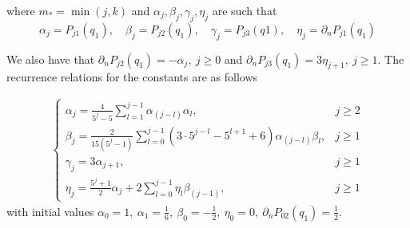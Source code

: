 \documentclass[12pt]{article}
\theoremstyle{plain}
\theoremstyle{definition}
\theoremstyle{remark}
\begin{document}
where $m_* = \min(j,k)$ and $\alpha_j, \beta_j, \gamma_j, \eta_j$ are such that 
$$\alpha_j = P_{j1}(q_1), \quad \beta_j = P_{j2}(q_1), \quad \gamma_j = P_{j3}(q1), \quad \eta_j = \partial_nP_{j1}(q_1)$$

We also have that $\partial_nP_{j2}(q_1) = -\alpha_j,\ j \geq 0$ and $\partial_nP_{j3}(q_1) = 3\eta_{j+1},\ j \geq 1$. The recurrence relations for the constants are as follows \cite{NSTY}

\begin{gather}
    \begin{cases}
    \alpha_j = \frac{4}{5^j - 5}\sum\limits_{l=1}^{j-1}\alpha_{(j-l)}\alpha_l, & j \geq 2\\
    \beta_j = \frac{2}{15(5^j - 1)}\sum\limits_{l=0}^{j-1}(3\cdot 5^{j-l} - 5^{l+1} + 6)\alpha_{(j-l)}\beta_l, & j \geq 1\\
    \gamma_j = 3\alpha_{j+1}, & j \geq 1\\
    \eta_j = \frac{5^j +1}{2}\alpha_j + 2\sum\limits_{l=0}^{j-1}\eta_l\beta_{(j-1)}, & j \geq 1
    \end{cases}
\end{gather}
with initial values $\alpha_0 = 1,\ \alpha_1 = \frac16, \ \beta_0 = -\frac12, \ \eta_0 = 0, \ \partial_nP_{02}(q_1) = \frac12$.
\end{document}
